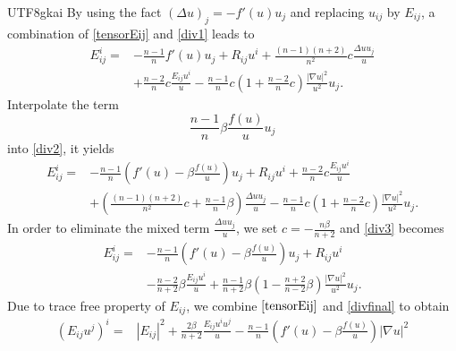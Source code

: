 \documentclass[reqno,12pt]{amsart}
\numberwithin{equation}{section}
\begin{document}
\begin{CJK}{UTF8}{gkai}
    By using the fact $(\Delta u)_{j}=-f'(u)u_{j}$ and replacing $u_{ij}$ by $E_{ij}$,  a combination of \eqref{tensorEij} and \eqref{div1} leads to
    \begin{equation}\label{div2}
    	\begin{aligned}
    		E_{ij}^{i}=&-\frac{n-1}{n}f'(u)u_{j}+R_{ij}u^{i}+\frac{(n-1)(n+2)}{n^{2}}c\frac{\Delta u u_{j}}{u}\\
    		&+\frac{n-2}{n}c\frac{E_{ij}u^{i}}{u}-\frac{n-1}{n}c\left(1+\frac{n-2}{n}c\right)\frac	{|\nabla u|^{2}}{u^{2}}u_{j}.
    	\end{aligned}
   \end{equation}
   Interpolate the term $$\frac{n-1}{n}\beta\frac{f(u)}{u}u_{j}$$ into \eqref{div2}, it yields
   \begin{equation}\label{div3}
   	\begin{aligned}
   		E_{ij}^{i}=&-\frac{n-1}{n}\left(f'(u)-\beta\frac{f(u)}{u}\right)u_{j}+R_{ij}u^{i}+\frac{n-2}{n}c\frac{E_{ij}u^{i}}{u}\\
   		&+\left(\frac{(n-1)(n+2)}{n^{2}}c+\frac{n-1}{n}\beta\right)\frac{\Delta u u_{j}}{u}-\frac{n-1}{n}c\left(1+\frac{n-2}{n}c\right)\frac	{|\nabla u|^{2}}{u^{2}}u_{j}.
   	\end{aligned}
   \end{equation}
   In order to eliminate the mixed term $\frac{\Delta u u_{j}}{u}$, we set $	c=-\frac{n\beta}{n+2}$ and \eqref{div3} becomes
   \begin{equation}\label{divfinal}
   	\begin{aligned}
   		E_{ij}^{i}=&-\frac{n-1}{n}\left(f'(u)-\beta\frac{f(u)}{u}\right)u_{j}+R_{ij}u^{i}\\&-\frac{n-2}{n+2}\beta\frac{E_{ij}u^{i}}{u}+\frac{n-1}{n+2}\beta(1-\frac{n+2}{n-2}\beta)\frac{|\nabla u|^{2}}{u^{2}}u_{j}.
   	\end{aligned}
   \end{equation}
   Due to trace free property of $E_{ij}$, we combine $\eqref{tensorEij}$ and \eqref{divfinal} to obtain
    \begin{equation}\label{equ 2.8}
    	\begin{aligned}
    	\left(E_{ij}u^{j}\right)^{i}=&|E_{ij}|^{2}+\frac{2\beta}{n+2}\frac{E_{ij}u^{i}u^{j}}{u}-\frac{n-1}{n}\left(f'(u)-\beta\frac{f(u)}{u}\right)|\nabla u|^{2}\\

\end{aligned}
\end{equation}
\end{CJK}
\end{document}
